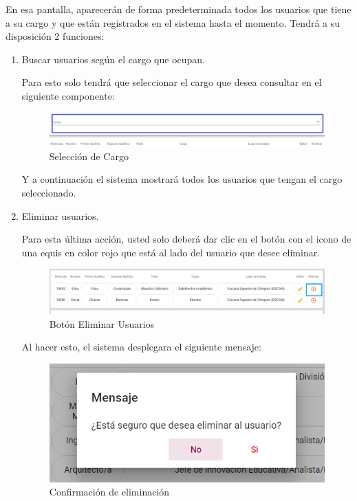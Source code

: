         En esa pantalla, aparecerán de forma predeterminada todos los usuarios que tiene a su cargo y que están registrados en el sistema hasta el momento. Tendrá a su disposición 2 funciones:
        \newpage
        \begin{enumerate}

            \item   Buscar usuarios según el cargo que ocupan.

                Para esto solo tendrá que seleccionar el cargo que desea consultar en el siguiente componente:

                \begin{figure}[H]
                    \centering
                    \hypertarget{cargo1}{\includegraphics[width=0.7\linewidth]{images/SP5/BtnCargo1}}
                    \caption{Selección de Cargo}
                    \label{cargo1}
                \end{figure}

                 Y a continuación el sistema mostrará todos los usuarios que tengan el cargo seleccionado.



            \item Eliminar usuarios.

                Para esta última acción, usted solo deberá dar clic en el botón con el icono de una equis en color rojo que está al lado del usuario que desee  eliminar.

                \begin{figure}[H]
                    \centering
                    \hypertarget{eliminar}{\includegraphics[width=0.7\linewidth]{images/SP5/BtnEliminar}}
                    \caption{Botón Eliminar Usuarios}
                    \label{eliminar}
                \end{figure}

                Al hacer esto, el sistema desplegara el siguiente mensaje:

               \begin{figure}[H]
                	\centering
                	\includegraphics[width=0.4\linewidth]{images/SP5/MSG22}
               	\caption{Confirmación de eliminación}
               	\label{confirmarE}


\end{figure}
\end{enumerate}
